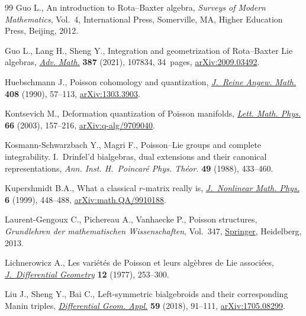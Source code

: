 \begin{thebibliography}{99}
Guo L., An introduction to {R}ota--{B}axter algebra, \textit{Surveys of Modern
 Mathematics}, Vol.~4, International Press, Somerville, MA, Higher Education
 Press, Beijing, 2012.

Guo L., Lang H., Sheng Y., Integration and geometrization of {R}ota--{B}axter
 {L}ie algebras, \href{https://doi.org/10.1016/j.aim.2021.107834}{\textit{Adv. Math.}} \textbf{387} (2021), 107834, 34~pages,
 \href{https://arxiv.org/abs/2009.03492}{arXiv:2009.03492}.

Huebschmann J., Poisson cohomology and quantization, \href{https://doi.org/10.1515/crll.1990.408.57}{\textit{J.~Reine Angew.
 Math.}} \textbf{408} (1990), 57--113, \href{https://arxiv.org/abs/1303.3903}{arXiv:1303.3903}.

Kontsevich M., Deformation quantization of {P}oisson manifolds, \href{https://doi.org/10.1023/B:MATH.0000027508.00421.bf}{\textit{Lett.
 Math. Phys.}} \textbf{66} (2003), 157--216, \href{https://arxiv.org/abs/q-alg/9709040}{arXiv:q-alg/9709040}.

Kosmann-Schwarzbach Y., Magri F., Poisson--{L}ie groups and complete
 integrability. {I}.~{D}rinfel'd bialgebras, dual extensions and their
 canonical representations, \textit{Ann. Inst. H.~Poincar\'e Phys. Th\'eor.}
 \textbf{49} (1988), 433--460.

Kupershmidt B.A., What a classical {$r$}-matrix really is, \href{https://doi.org/10.2991/jnmp.1999.6.4.5}{\textit{J.~Nonlinear
 Math. Phys.}} \textbf{6} (1999), 448--488, \href{https://arxiv.org/abs/math.QA/9910188}{arXiv:math.QA/9910188}.

Laurent-Gengoux C., Pichereau A., Vanhaecke P., Poisson structures,
 \textit{Grundlehren der mathematischen Wissenschaften}, Vol.~347, \href{https://doi.org/10.1007/978-3-642-31090-4}{Springer},
 Heidelberg, 2013.

Lichnerowicz A., Les vari\'et\'es de {P}oisson et leurs alg\`ebres de {L}ie
 associ\'ees, \href{https://doi.org/10.4310/jdg/1214433987}{\textit{J.~Differential Geometry}} \textbf{12} (1977), 253--300.

Liu J., Sheng Y., Bai C., Left-symmetric bialgebroids and their corresponding
 {M}anin triples, \href{https://doi.org/10.1016/j.difgeo.2018.04.003}{\textit{Differential Geom. Appl.}} \textbf{59} (2018),
 91--111, \href{https://arxiv.org/abs/1705.08299}{arXiv:1705.08299}.


\end{thebibliography}
